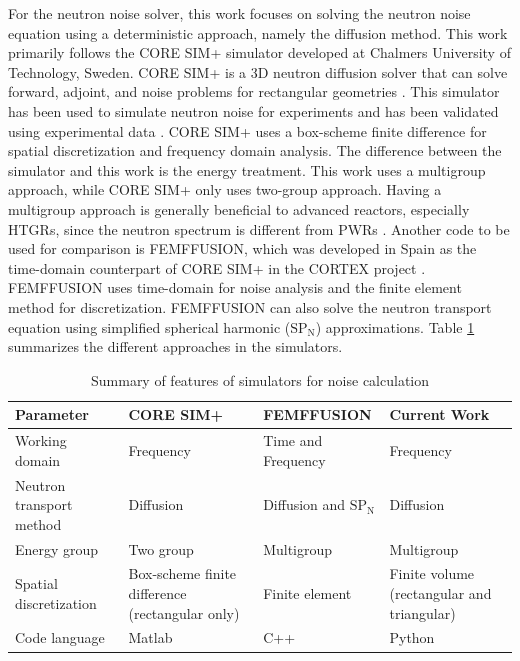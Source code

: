 For the neutron noise solver, this work focuses on solving the neutron noise equation using a deterministic approach, namely the diffusion method. This work primarily follows the CORE SIM+ simulator developed at Chalmers University of Technology, Sweden. CORE SIM+ is a 3D neutron diffusion solver that can solve forward, adjoint, and noise problems for rectangular geometries \cite{mylonakisCORESIMFlexible2021}. This simulator has been used to simulate neutron noise for experiments and has been validated using experimental data \cite{mylonakisCORESIMSimulations2021,hursinModelingNoiseExperiments2023}. CORE SIM+ uses a box-scheme finite difference for spatial discretization and frequency domain analysis. The difference between the simulator and this work is the energy treatment. This work uses a multigroup approach, while CORE SIM+ only uses two-group approach. Having a multigroup approach is generally beneficial to advanced reactors, especially \glspl*{HTGR}, since the neutron spectrum is different from \glspl*{PWR} \cite{ardiansyahEvaluationPBMR400Core2021}. Another code to be used for comparison is FEMFFUSION, which was developed in Spain as the time-domain counterpart of CORE SIM+ in the \gls*{CORTEX} project \cite{demaziereCORTEXProjectImproving2020}. FEMFFUSION uses time-domain for noise analysis and the finite element method for discretization. FEMFFUSION can also solve the neutron transport equation using simplified spherical harmonic ($\text{SP}_\text{N}$) approximations. Table \ref{table:other_works} summarizes the different approaches in the simulators.

\begin{table}[ht]
    \centering
    \caption{Summary of features of simulators for noise calculation}
    {\renewcommand{\arraystretch}{1.5}%
    \begin{tabular}{ | >{\raggedright\arraybackslash}m{3.0cm} | >{\centering\arraybackslash}m{3.5cm} |>{\centering\arraybackslash}m{3.0cm} | >{\centering\arraybackslash}m{3.5cm} | } 
     \hline
     \textbf{Parameter} & \textbf{CORE SIM+} & \textbf{FEMFFUSION}& \textbf{Current Work} \\ 
     \hline
     Working domain & Frequency &  Time and Frequency & Frequency \\ 
     \hline
     Neutron transport method & Diffusion & Diffusion and $\text{SP}_\text{N}$ & Diffusion\\ 
     \hline
     Energy group & Two group & Multigroup & Multigroup \\ 
     \hline
     Spatial discretization & Box-scheme finite difference (rectangular only) & Finite element & Finite volume (rectangular and triangular) \\ 
     \hline
     Code language & Matlab & C++ & Python\\ 
     \hline
    \end{tabular}} \quad
    \label{table:other_works}
\end{table}

